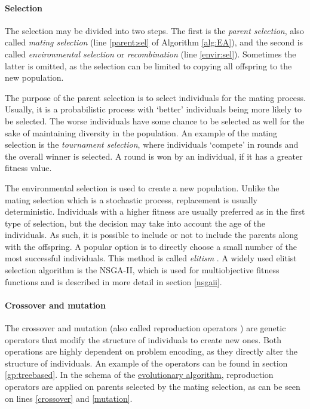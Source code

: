 \paragraph{Selection} \label{p}
The selection may be divided into two steps. The first is the 
\emph{parent selection}, also called \emph{mating selection}
(line \ref{parent:sel} of Algorithm \ref{alg:EA}), and the second is called
\emph{environmental selection} or \emph{recombination} (line \ref{envir:sel}).
Sometimes the latter is omitted, as the selection can be limited to copying 
all offspring to the new population.

The purpose of the parent selection is to select individuals for the
mating process. Usually, it is a probabilistic process with `better'
individuals being more likely to be selected. The worse individuals have some
chance to be selected as well for the sake of maintaining diversity in the
population. An example of the mating selection is the
\emph{tournament selection}, where individuals `compete' in rounds and the
overall winner is selected. A round is won by an individual, if it has a 
greater fitness value.

The environmental selection is used to create a new 
population. Unlike the mating selection which is a stochastic process,
replacement is usually deterministic. Individuals with a higher fitness are
usually preferred as in the first type of selection, but the decision may take 
into account the age of the individuals. As such, it is possible to include 
or not to include the parents along with the offspring. A popular option is to 
directly choose a small number of the most successful individuals. This method 
is called \emph{elitism} \citep{Eiben:2015:IEC:2810085}.
A widely used elitist selection algorithm is the NSGA-II, which is used for
multiobjective fitness functions and is described in more detail in section
\ref{nsgaii}.

\paragraph{Crossover and mutation}
The crossover and mutation (also called reproduction operators
\citep{Engelbrecht:2007:CII:1557464}) are genetic operators that modify the
structure of individuals to create new ones. Both operations are highly
dependent on problem encoding, as they directly alter the structure of
individuals. An example of the operators can be found in section
\ref{gp:treebased}. In the schema of the
\hyperref[alg:EA]{evolutionary algorithm}, reproduction operators
are applied on parents selected by the mating selection, as can be seen on 
lines \ref{crossover} and \ref{mutation}.

